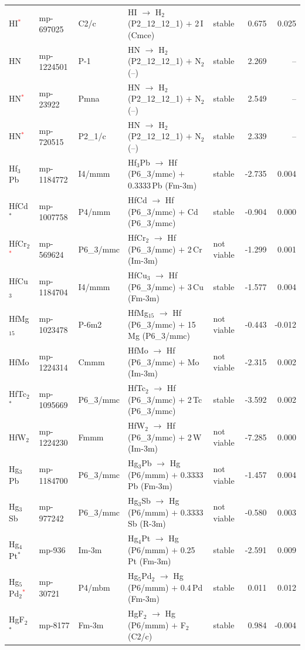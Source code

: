 \begin{longtable}{@{}ll l@{\hspace{4pt}} p{4.6cm} l@{\hspace{4pt}} rr@{}}
HI\textcolor{red}{$^*$} & mp-697025 & C2/c & HI $\to$ H$_{2}$ (P2\_12\_12\_1) $+$ 2\,I (Cmce) & stable & 0.675 & 0.025 \\
HN & mp-1224501 & P-1 & HN $\to$ H$_{2}$ (P2\_12\_12\_1) $+$ N$_{2}$ (--) & stable & 2.269 & -- \\
HN\textcolor{red}{$^*$} & mp-23922 & Pmna & HN $\to$ H$_{2}$ (P2\_12\_12\_1) $+$ N$_{2}$ (--) & stable & 2.549 & -- \\
HN\textcolor{red}{$^*$} & mp-720515 & P2\_1/c & HN $\to$ H$_{2}$ (P2\_12\_12\_1) $+$ N$_{2}$ (--) & stable & 2.339 & -- \\
Hf$_{3}$Pb & mp-1184772 & I4/mmm & Hf$_{3}$Pb $\to$ Hf (P6\_3/mmc) $+$ 0.3333\,Pb (Fm-3m) & stable & -2.735 & 0.004 \\
HfCd$^*$ & mp-1007758 & P4/nmm & HfCd $\to$ Hf (P6\_3/mmc) $+$ Cd (P6\_3/mmc) & stable & -0.904 & 0.000 \\
HfCr$_{2}$\textcolor{red}{$^*$} & mp-569624 & P6\_3/mmc & HfCr$_{2}$ $\to$ Hf (P6\_3/mmc) $+$ 2\,Cr (Im-3m) & not viable & -1.299 & 0.001 \\
HfCu$_{3}$ & mp-1184704 & I4/mmm & HfCu$_{3}$ $\to$ Hf (P6\_3/mmc) $+$ 3\,Cu (Fm-3m) & stable & -1.577 & 0.004 \\
HfMg$_{15}$ & mp-1023478 & P-6m2 & HfMg$_{15}$ $\to$ Hf (P6\_3/mmc) $+$ 15\,Mg (P6\_3/mmc) & not viable & -0.443 & -0.012 \\
HfMo & mp-1224314 & Cmmm & HfMo $\to$ Hf (P6\_3/mmc) $+$ Mo (Im-3m) & not viable & -2.315 & 0.002 \\
HfTc$_{2}$$^*$ & mp-1095669 & P6\_3/mmc & HfTc$_{2}$ $\to$ Hf (P6\_3/mmc) $+$ 2\,Tc (P6\_3/mmc) & stable & -3.592 & 0.002 \\
HfW$_{2}$ & mp-1224230 & Fmmm & HfW$_{2}$ $\to$ Hf (P6\_3/mmc) $+$ 2\,W (Im-3m) & not viable & -7.285 & 0.000 \\
Hg$_{3}$Pb & mp-1184700 & P6\_3/mmc & Hg$_{3}$Pb $\to$ Hg (P6/mmm) $+$ 0.3333\,Pb (Fm-3m) & not viable & -1.457 & 0.004 \\
Hg$_{3}$Sb & mp-977242 & P6\_3/mmc & Hg$_{3}$Sb $\to$ Hg (P6/mmm) $+$ 0.3333\,Sb (R-3m) & not viable & -0.580 & 0.003 \\
Hg$_{4}$Pt$^*$ & mp-936 & Im-3m & Hg$_{4}$Pt $\to$ Hg (P6/mmm) $+$ 0.25\,Pt (Fm-3m) & stable & -2.591 & 0.009 \\
Hg$_{5}$Pd$_{2}$\textcolor{red}{$^*$} & mp-30721 & P4/mbm & Hg$_{5}$Pd$_{2}$ $\to$ Hg (P6/mmm) $+$ 0.4\,Pd (Fm-3m) & stable & 0.011 & 0.012 \\
HgF$_{2}$$^*$ & mp-8177 & Fm-3m & HgF$_{2}$ $\to$ Hg (P6/mmm) $+$ F$_{2}$ (C2/c) & stable & 0.984 & -0.004 \\

\end{longtable}
